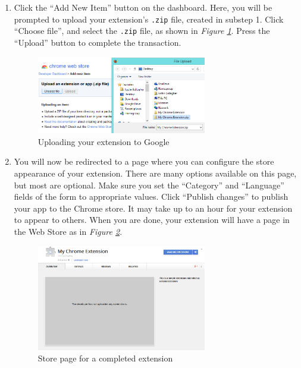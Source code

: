 \documentclass[11pt]{article}
\begin{document}
\begin{enumerate}
	\item Click the ``Add New Item'' button on the dashboard. Here, you will be prompted to upload your extension's \texttt{.zip} file, created in substep 1. Click ``Choose file'', and select the \texttt{.zip} file, as shown in \emph{Figure \ref{fig:uploadext}}. Press the ``Upload'' button to complete the transaction.\\

	\begin{figure}[htb]
	\centering
	\includegraphics[width=0.7\textwidth]{figures/uploadext.png}
	\caption{Uploading your extension to Google\label{fig:uploadext}}
	\end{figure}

	\item You will now be redirected to a page where you can configure the store appearance of your extension. There are many options available on this page, but most are optional. Make sure you set the ``Category'' and ``Language'' fields of the form to appropriate values. Click ``Publish changes'' to publish your app to the Chrome store. It may take up to an hour for your extension to appear to others. When you are done, your extension will have a page in the Web Store as in \emph{Figure \ref{fig:publishedext}}.\\

	\begin{figure}[htb]
	\centering
	\includegraphics[width=0.7\textwidth]{figures/publishedext.png}
	\caption{Store page for a completed extension\label{fig:publishedext}}
	\end{figure}
\end{enumerate}
\end{document}
